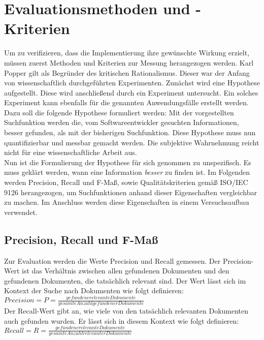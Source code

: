 \chapter{Evaluationsmethoden und -Kriterien}
Um zu verifizieren, dass die Implementierung ihre gewünschte Wirkung erzielt, müssen zuerst Methoden und Kriterien zur Messung herangezogen werden.
Karl Popper gilt als Begründer des kritischen Rationalismus.
Dieser war der Anfang von wissenschaftlich durchgeführten Experimenten.
Zunächst wird eine Hypothese aufgestellt.
Diese wird anschließend durch ein Experiment untersucht.
Ein solches Experiment kann ebenfalls für die genannten Anwendungsfälle erstellt werden.
Dazu soll die folgende Hypothese formuliert werden: Mit der vorgestellten Suchfunktion werden die, vom Softwareentwickler gesuchten Informationen, besser gefunden, als mit der bisherigen Suchfunktion.
Diese Hypothese muss nun quantifizierbar und messbar gemacht werden.
Die subjektive Wahrnehmung reicht nicht für eine wissenschaftliche Arbeit aus.\\

Nun ist die Formulierung der Hypothese für sich genommen zu unspezifisch.
Es muss geklärt werden, wann eine Information \textit{besser} zu finden ist.
Im Folgenden werden Precision, Recall und F-Maß, sowie Qualitätskriterien gemäß ISO/IEC 9126 herangezogen, um Suchfunktionen anhand dieser Eigenschaften vergleichbar zu machen.
Im Anschluss werden diese Eigenschaften in einem Versuchsaufbau verwendet. 

\section{Precision, Recall und F-Maß}
Zur Evaluation werden die Werte Precision und Recall gemessen.
Der Precision-Wert ist das Verhältnis zwischen allen gefundenen Dokumenten und den gefundenen Dokumenten, die tatsächlich relevant sind.
Der Wert lässt sich im Kontext der Suche nach Dokumenten wie folgt definieren\cite{Sirotkin_2012}:\\

\(Precision=P=\frac{gefundene relevante Dokumente}{gesamte Anzahl gefundener Dokumente} \)\\

Der Recall-Wert gibt an, wie viele von den tatsächlich relevanten Dokumenten auch gefunden wurden.
Er lässt sich in diesem Kontext wie folgt definieren\cite{Sirotkin_2012}:\\

\(Recall=R=\frac{gefundene relevante Dokumente}{gesamte Anzahl relevanter Dokumente}\)\\

